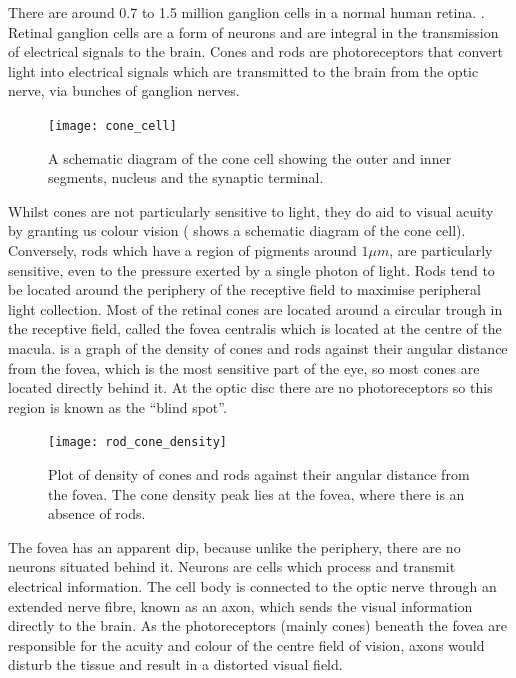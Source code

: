 There are around 0.7 to 1.5 million ganglion cells in a normal human retina.
\cite{curcio1990topography}. Retinal ganglion cells are a form of neurons
and are integral in the transmission of electrical signals to the brain.
\cite{meyer1995characterization} Cones and rods are photoreceptors
that convert light into electrical signals which are transmitted to the
brain from the optic nerve, via bunches of ganglion nerves.

\begin{figure}[!htbp]
\centering
  \texttt{[image: cone\_cell]}
\caption{A schematic diagram of the cone cell showing the outer and inner
segments, nucleus and the synaptic terminal.\cite{wikicone}}
\label{fig:cone}
\end{figure}

Whilst cones are not particularly sensitive to light, they do aid to visual
acuity by granting us colour vision ( shows a schematic
diagram of the cone cell).\cite{bowmaker1980visual} Conversely, rods
which have a region of pigments around $1\mu{m}$, are particularly
sensitive, even to the pressure exerted by a single photon of light. Rods
tend to be located around the periphery of the receptive field to maximise
peripheral light collection.\cite{liebman1964sensitive,baylor1979responses}
Most of the retinal cones are located around a circular trough in the receptive
field, called the fovea centralis which is located at the centre of the macula.
\cite{hendrickson1994primate}
 is a graph of the density of cones and rods against
their angular distance from the fovea, which is the most sensitive part of
the eye, so most cones are located directly behind it. At the optic disc there
are no photoreceptors so this region is known as the \enquote{blind spot}.

\begin{figure}[!htbp]
\centering
  \texttt{[image: rod\_cone\_density]}
\caption{Plot of density of cones and rods against their angular distance from
the fovea. The cone density peak lies at the fovea, where there is an absence
of rods.\cite{rod_cone_density}}
\label{fig:rod_cone_density}
\end{figure}

The fovea has an apparent dip, because unlike the periphery, there are
no neurons situated behind it. Neurons are cells which process and
transmit electrical information. The cell body is connected to the optic
nerve through an extended nerve fibre, known as an axon, which sends
the visual information directly to the brain. As the photoreceptors (mainly
cones) beneath the fovea are responsible for the acuity and colour of the
centre field of vision, axons would disturb the tissue and result in a
distorted visual field.

